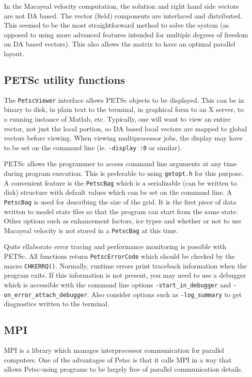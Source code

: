 \documentclass[final]{amsart}
\renewcommand{\t}[1]{\texttt{#1}}
\begin{document}
In the Macayeal velocity computation, the solution and right hand side vectors are not DA
based. The vector (field) components are interlaced and distributed. This seemed to be the
most straightforward method to solve the system (as opposed to using more advanced
features intended for multiple degrees of freedom on DA based vectors). This also allows
the matrix to have an optimal parallel layout.

\subsection{PETSc utility functions}
The \t{PetscViewer} interface allows PETSc objects to be displayed. This can be in binary
to disk, in plain text to the terminal, in graphical form to an X server, to a running
instance of Matlab, etc. Typically, one will want to view an entire vector, not just the
local portion, so DA based local vectors are mapped to global vectors before viewing. When
viewing multiprocessor jobs, the display may have to be set on the command line (ie.
\t{-display :0} or similar).

PETSc allows the programmer to access command line arguments at any time during program
execution. This is preferable to using \t{getopt.h} for this purpose. A convenient feature
is the \t{PetscBag} which is a serializable (can be written to disk) structure with
default values which can be set on the command line. A \t{PetscBag} is used for describing
the size of the grid. It is the first piece of data written to model state files so that
the program can start from the same state. Other options such as enhancement factors, ice
types and whether or not to use Macayeal velocity is not stored in a \t{PetscBag} at this
time.

Quite ellaborate error tracing and performance monitoring is possible with PETSc. All
functions return \t{PetscErrorCode} which should be checked by the macro \t{CHKERRQ()}.
Normally, runtime errors print traceback information when the program exits. If this
information is not present, you may need to use a debugger which is accessible with the
command line options \verb|-start_in_debugger| and \verb|-on_error_attach_debugger|. Also
consider options such as \verb|-log_summary| to get diagnostics written to the terminal.

\subsection{MPI}  MPI is a library which manages interprocessor communication for parallel computers.  One of the advantages of Petsc is that it calls MPI in a way that allows Petsc-using programs to be largely free of parallel communication details.
\end{document}
